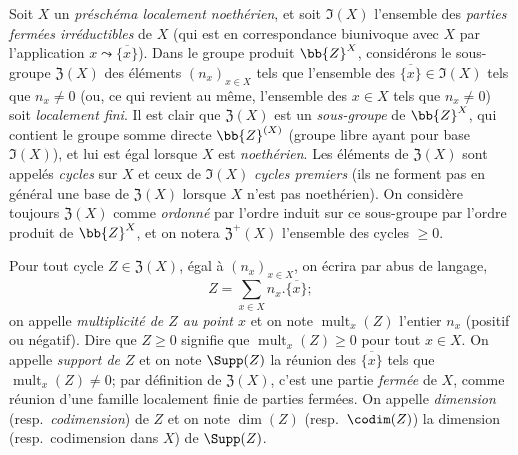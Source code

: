 \begin{env}[21.6.1]
Soit $X$ un \emph{préschéma localement noethérien}, et soit $\mathfrak{I}(X)$ l'ensemble des \emph{parties fermées irréductibles} de $X$ (qui est en correspondance biunivoque avec $X$ par l'application $x\leadsto\overline{\{x\}}$).
Dans le groupe produit $\bb{Z}^X$, considérons le sous-groupe $\mathfrak{Z}(X)$ des éléments $(n_x)_{x\in X}$ tels que l'ensemble des $\overline{\{x\}}\in\mathfrak{I}(X)$ tels que $n_x\neq0$ (ou, ce qui revient
au même, l'ensemble des $x\in X$ tels que $n_x\neq0$) soit \emph{localement fini}.
Il est clair que $\mathfrak{Z}(X)$ est un \emph{sous-groupe} de $\bb{Z}^X$, qui contient le groupe somme directe $\bb{Z}^{(X)}$ (groupe libre ayant pour base $\mathfrak{I}(X)$), et lui est égal lorsque $X$ est \emph{noethérien}.
Les éléments de $\mathfrak{Z}(X)$ sont appelés \emph{cycles} sur $X$ et ceux de $\mathfrak{I}(X)$ \emph{cycles premiers} (ils ne forment pas en général une base de $\mathfrak{Z}(X)$ lorsque $X$ n'est pas noethérien).
On considère toujours $\mathfrak{Z}(X)$ comme \emph{ordonné} par l'ordre induit sur ce sous-groupe par l'ordre produit de $\bb{Z}^X$, et on notera $\mathfrak{Z}^+(X)$ l'ensemble des cycles $\geq0$.

Pour tout cycle $Z\in\mathfrak{Z}(X)$, égal à $(n_x)_{x\in X}$, on écrira par abus de langage,
\[
  Z=\sum_{x\in X}n_x.\overline{\{x\}};
\]
on appelle \emph{multiplicité de $Z$ au point $x$} et on note $\operatorname{mult}_x(Z)$ l'entier $n_x$ (positif ou négatif).
Dire que $Z\geq0$ signifie que $\operatorname{mult}_x(Z)\geq0$ pour tout $x\in X$.
On appelle \emph{support de $Z$} et on note $\Supp(Z)$ la réunion des $\overline{\{x\}}$ tels que $\operatorname{mult}_x(Z)\neq0$;
par définition de $\mathfrak{Z}(X)$, c'est une partie \emph{fermée} de $X$, comme réunion d'une famille localement finie de parties fermées.
On appelle \emph{dimension} (resp.\ \emph{codimension}) de $Z$ et on note $\dim(Z)$ (resp.\ $\codim(Z)$) la dimension (resp.\ codimension dans $X$) de $\Supp(Z)$.
\end{env}

